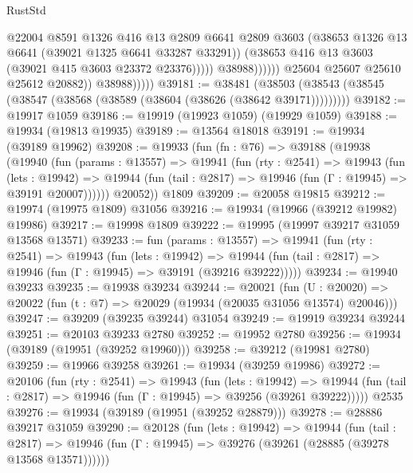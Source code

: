 \begin{lexlean}{RustStd}
\begin{coremodule}
                                    @22004
                                    @8591
                                    @1326
                                    @416
                                    @13
                                    @2809
                                    @6641
                                    @2809
                                    @3603
                                    (@38653 @1326 @13 @6641 (@39021 @1325 @6641 @33287 @33291))
                                    (@38653 @416 @13 @3603 (@39021 @415 @3603 @23372 @23376)))))
                              @38988))))))
                  @25604
                  @25607
                  @25610
                  @25612
                  @20882))
              @38988)))))
@39181 := @38481
    (@38503 (@38543 (@38545 (@38547 (@38568 (@38589 (@38604 (@38626 (@38642 @39171)))))))))
@39182 := @19917 @1059
@39186 := @19919 (@19923 @1059) (@19929 @1059)
@39188 := @19934 (@19813 @19935)
@39189 := @13564 @18018
@39191 := @19934 (@39189 @19962)
@39208 := @19933
    (fun (fn : @76) =>
    @39188
      (@19938
        (@19940
          (fun (params : @13557) =>
          @19941
            (fun (rty : @2541) =>
            @19943
              (fun (lets : @19942) =>
              @19944 (fun (tail : @2817) => @19946 (fun (Γ : @19945) => @39191 @20007))))))
        @20052))
    @1809
@39209 := @20058 @19815
@39212 := @19974 (@19975 @1809) @31056
@39216 := @19934 (@19966 (@39212 @19982) @19986)
@39217 := @19998 @1809
@39222 := @19995 (@19997 @39217 @31059 @13568 @13571)
@39233 := fun (params : @13557) =>
  @19941
    (fun (rty : @2541) =>
    @19943
      (fun (lets : @19942) =>
      @19944 (fun (tail : @2817) => @19946 (fun (Γ : @19945) => @39191 (@39216 @39222)))))
@39234 := @19940 @39233
@39235 := @19938 @39234
@39244 := @20021
    (fun (U : @20020) => @20022 (fun (t : @7) => @20029 (@19934 (@20035 @31056 @13574) @20046)))
@39247 := @39209 (@39235 @39244) @31054
@39249 := @19919 @39234 @39244
@39251 := @20103 @39233 @2780
@39252 := @19952 @2780
@39256 := @19934 (@39189 (@19951 (@39252 @19960)))
@39258 := @39212 (@19981 @2780)
@39259 := @19966 @39258
@39261 := @19934 (@39259 @19986)
@39272 := @20106
    (fun (rty : @2541) =>
    @19943
      (fun (lets : @19942) =>
      @19944 (fun (tail : @2817) => @19946 (fun (Γ : @19945) => @39256 (@39261 @39222)))))
    @2535
@39276 := @19934 (@39189 (@19951 (@39252 @28879)))
@39278 := @28886 @39217 @31059
@39290 := @20128
    (fun (lets : @19942) =>
    @19944
      (fun (tail : @2817) =>
      @19946 (fun (Γ : @19945) => @39276 (@39261 (@28885 (@39278 @13568 @13571))))))

\end{coremodule}
\end{lexlean}

